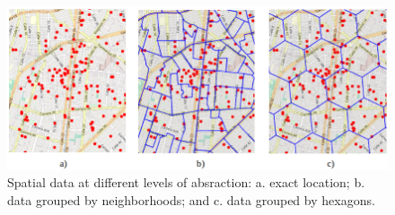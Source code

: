 \documentclass{article}
\begin{document}
\begin{figure}[ptb]
    \centering
    \includegraphics[width=.95\linewidth]{imgs/geolocations}
    \caption{Spatial data at different levels of absraction: a. exact location; b. data grouped by neighborhoods; and c. data grouped by hexagons.}
    \label{fig:spatialLevels}
\end{figure}

 

\end{document}

